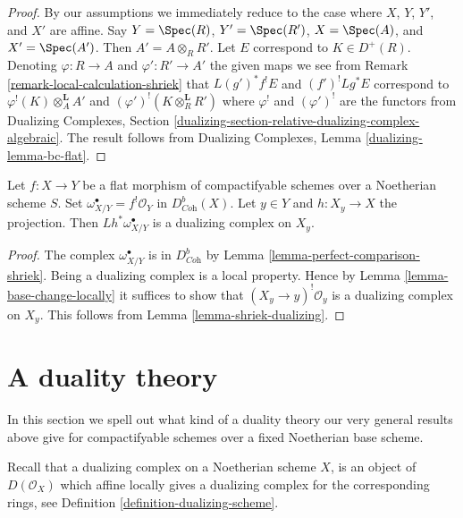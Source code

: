 \begin{proof}
By our assumptions we immediately reduce to the case where
$X$, $Y$, $Y'$, and $X'$ are affine.
Say $Y = \Spec(R)$, $Y' = \Spec(R')$, $X = \Spec(A)$, and $X' = \Spec(A')$.
Then $A' = A \otimes_R R'$. Let
$E$ correspond to $K \in D^+(R)$.
Denoting $\varphi : R \to A$ and $\varphi' : R' \to A'$
the given maps we see from
Remark \ref{remark-local-calculation-shriek}
that $L(g')^*f^!E$ and $(f')^!Lg^*E$ correspond to
$\varphi^!(K) \otimes_A^\mathbf{L} A'$ and
$(\varphi')^!(K \otimes_R^\mathbf{L} R')$
where $\varphi^!$ and $(\varphi')^!$ are the functors from
Dualizing Complexes, Section
\ref{dualizing-section-relative-dualizing-complex-algebraic}.
The result follows from
Dualizing Complexes, Lemma \ref{dualizing-lemma-bc-flat}.
\end{proof}

\begin{lemma}
\label{lemma-relative-dualizing-fibres}
Let $f : X \to Y$ be a flat morphism of compactifyable schemes over
a Noetherian scheme $S$. Set
$\omega_{X/Y}^\bullet = f^!\mathcal{O}_Y$ in $D^b_{\textit{Coh}}(X)$.
Let $y \in Y$ and $h : X_y \to X$ the projection.
Then $Lh^*\omega_{X/Y}^\bullet$ is a dualizing complex
on $X_y$.
\end{lemma}

\begin{proof}
The complex $\omega_{X/Y}^\bullet$ is in $D^b_{\textit{Coh}}$
by Lemma \ref{lemma-perfect-comparison-shriek}.
Being a dualizing complex is a local property.
Hence by Lemma \ref{lemma-base-change-locally}
it suffices to show that $(X_y \to y)^!\mathcal{O}_y$
is a dualizing complex on $X_y$.
This follows from Lemma \ref{lemma-shriek-dualizing}.
\end{proof}








\section{A duality theory}
\label{section-duality}

\noindent
In this section we spell out what kind of a duality theory
our very general results above give for compactifyable schemes
over a fixed Noetherian base scheme.

\medskip\noindent
Recall that a dualizing complex on a Noetherian scheme $X$, is an
object of $D(\mathcal{O}_X)$ which affine locally gives a dualizing
complex for the corresponding rings, see
Definition \ref{definition-dualizing-scheme}.


